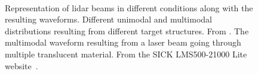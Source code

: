 \begin{figure}
    \centering
    \\\vspace{1em}
    \caption[Representation of \gls*{lidar} beams in different conditions along with the resulting waveforms.]{Representation of \gls*{lidar} beams in different conditions along with the resulting waveforms. \protect{} Different unimodal and multimodal distributions resulting from different target structures. From \citet{lidar_figure1}. \protect{} The multimodal waveform resulting from a laser beam going through multiple translucent material. From the SICK LMS500-21000 Lite website~\citep{sick_waveform}.}
    \label{fig:lidar_waveform}
\end{figure}

